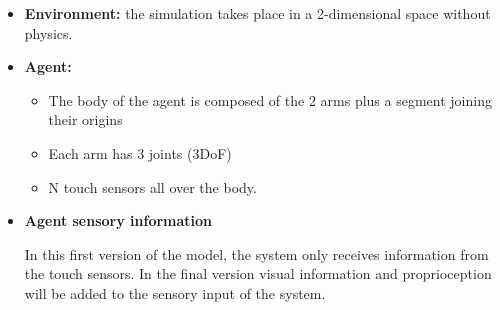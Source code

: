 \documentclass[11pt]{article}
\begin{document}
\begin{itemize}

    \item \textbf{Environment:} the simulation takes place
        in a 2-dimensional space without physics.

    \item \textbf{Agent:} \begin{itemize}

            \item The body of the agent is composed of the 2
                arms plus a segment joining their origins

            \item Each arm has 3 joints (3DoF)

            \item N touch sensors all over the body.

        \end{itemize}

    \item \textbf{Agent sensory information}
    	
    In this first version of the model, the system only
    receives information from the touch sensors. In the
    final version visual information and proprioception will
    be added to the sensory input of the system.

        \begin{itemize}








\end{itemize}
\end{itemize}
\end{document}
